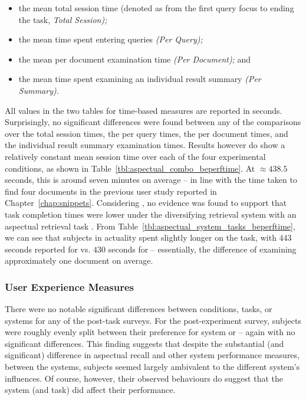 \begin{itemize}
    \item{the mean total session time (denoted as from the first query focus to ending the task, \emph{Total Session);}}
    \item{the mean time spent entering queries \emph{(Per Query);}}
    \item{the mean per document examination time \emph{(Per Document);} and}
    \item{the mean time spent examining an individual result summary \emph{(Per Summary).}}
\end{itemize}

All values in the two tables for time-based measures are reported in seconds. Surprisingly, no significant differences were found between any of the comparisons over the total session times, the per query times, the per document times, and the individual result summary examination times. Results however do show a relatively constant mean session time over each of the four experimental conditions, as shown in Table~\ref{tbl:aspectual_combo_beperftime}. At $\approx 438.5$ seconds, this is around seven minutes on average -- in line with the time taken to find four documents in the previous user study reported in Chapter~\ref{chap:snippets}. Considering , no evidence was found to support that task completion times were lower under the diversifying retrieval system with an aspectual retrieval task . From Table~\ref{tbl:aspectual_system_tasks_beperftime}, we can see that subjects in actuality spent slightly longer on the task, with $443$ seconds reported for  vs. $430$ seconds for  -- essentially, the difference of examining approximately one document on average.

\subsubsection{User Experience Measures}\label{sec:diversity:users:results:experience}
There were no notable significant differences between conditions, tasks, or systems for any of the post-task surveys. For the post-experiment survey, subjects were roughly evenly split between their preference for system  or  -- again with no significant differences. This finding suggests that despite the substantial (and significant) difference in aspectual recall and other system performance measures, between the systems, subjects seemed largely ambivalent to the different system's influences. Of course, however, their observed behaviours do suggest that the system (and task) did affect their performance.

